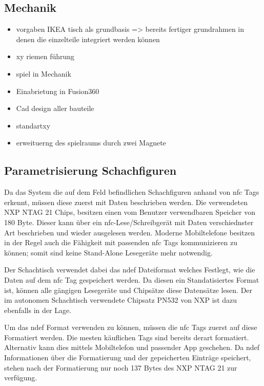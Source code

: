 \hypertarget{mechanik}{%
\subsection{Mechanik}\label{mechanik}}

\begin{itemize}
\tightlist
\item
  vorgaben IKEA tisch als grundbasis =\textgreater{} bereits fertiger
  grundrahmen in denen die einzelteile integriert werden können
\item
  xy riemen führung
\item
  spiel in Mechanik
\item
  Einabrietung in Fusion360
\item
  Cad design aller bauteile
\item
  standartxy
\item
  erweituerng des spielraums durch zwei Magnete
\end{itemize}

\hypertarget{parametrisierung-schachfiguren}{%
\subsection{Parametrisierung
Schachfiguren}\label{parametrisierung-schachfiguren}}

Da das System die auf dem Feld befindlichen Schachfiguren anhand von
\gls{nfc} Tags erkennt, müssen diese zuerst mit Daten beschrieben
werden. Die verwendeten NXP NTAG 21 Chips, besitzen einen vom Benutzer
verwendbaren Speicher von 180 Byte. Dieser kann über ein
\gls{nfc}-Lese/Schreibgerät mit Daten verschiednster Art beschrieben und
wieder ausgelesen werden. Moderne Mobiltelefone besitzen in der Regel
auch die Fähigkeit mit passenden \gls{nfc} Tags kommunizieren zu können;
somit sind keine Stand-Alone Lesegeräte mehr notwendig.

Der Schachtisch verwendet dabei das \gls{ndef} Dateiformat welches
Festlegt, wie die Daten auf dem \gls{nfc} Tag gespeichert werden. Da
diesen ein Standatisiertes Format ist, können alle gängigen Lesegeräte
und Chipsätze diese Datensätze lesen. Der im autonomen Schachtisch
verwendete Chipsatz PN532 von NXP ist dazu ebenfalls in der Lage.

Um das \gls{ndef} Format verwenden zu können, müssen die \gls{nfc} Tags
zuerst auf diese Formatiert werden. Die mesten käuflichen Tags sind
bereits derart formatiert. Alternativ kann dies mittels Mobiltelefon und
passender App geschehen. Da \gls{ndef} Informationen über die
Formatierung und der gepeicherten Einträge speichert, stehen nach der
Formatierung nur noch 137 Bytes des NXP NTAG 21 zur verfügung.

